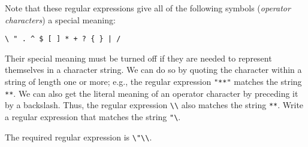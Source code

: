 \begin{exercise}\label{ex:030307}
    Note that these regular expressions give all of the following symbols 
    (\emph{operator characters}) a special meaning:
    
    \texttt{\textbackslash\ " . \^{} \$ [ ] * + ? \{ \} | /}
    
    \noindent Their special meaning must be turned off if they are needed to represent 
    themselves in a character string. We can do so by quoting the character 
    within a string of length one or more; e.g., the regular expression 
    \texttt{"**"} matches the string \texttt{**}. We can also get the literal 
    meaning of an operator character by preceding it by a backslash. Thus, the 
    regular expression \texttt{\textbackslash*\textbackslash*} also matches the 
    string \texttt{**}. Write a regular expression that matches the string 
    \texttt{"\textbackslash}.
\end{exercise}
\begin{solution}\label{sol:030307}
    The required regular expression is \texttt{\textbackslash"\textbackslash\textbackslash}.
\end{solution}